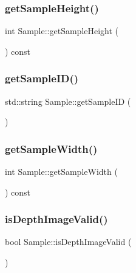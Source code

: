 \subsubsection{\texorpdfstring{get\+Sample\+Height()}{getSampleHeight()}}
{\footnotesize\ttfamily int Sample\+::get\+Sample\+Height (\begin{DoxyParamCaption}{ }\end{DoxyParamCaption}) const}

\mbox{\label{struct_sample_adead1781500bbf8508eae6f983621d3a}} 
\subsubsection{\texorpdfstring{get\+Sample\+I\+D()}{getSampleID()}}
{\footnotesize\ttfamily std\+::string Sample\+::get\+Sample\+ID (\begin{DoxyParamCaption}{ }\end{DoxyParamCaption})}

\mbox{\label{struct_sample_a90e4c417c9b81664bd0027a7ea2aeedc}} 
\subsubsection{\texorpdfstring{get\+Sample\+Width()}{getSampleWidth()}}
{\footnotesize\ttfamily int Sample\+::get\+Sample\+Width (\begin{DoxyParamCaption}{ }\end{DoxyParamCaption}) const}

\mbox{\label{struct_sample_a081726861f4977cb88fcdf709dd58cc9}} 
\subsubsection{\texorpdfstring{is\+Depth\+Image\+Valid()}{isDepthImageValid()}}
{\footnotesize\ttfamily bool Sample\+::is\+Depth\+Image\+Valid (\begin{DoxyParamCaption}{ }\end{DoxyParamCaption})}

